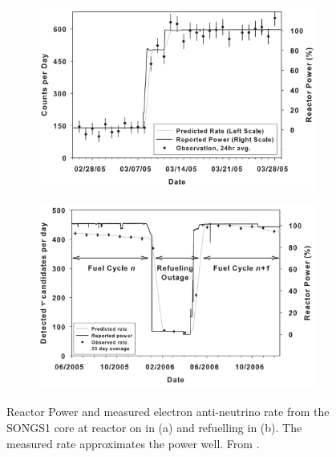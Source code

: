 \begin{figure}[!h]
\centering
\begin{subfigure}{.5\textwidth}
  \centering
  \includegraphics[width=\linewidth]{Chapter1/Figs/reactorPowerSongsS1.png}
  \captionsetup{width=.9\linewidth}
  \caption{}
  \label{subFig:reactorPowerSongsS1}
\end{subfigure}%
\begin{subfigure}{.5\textwidth}
  \centering
\includegraphics[width=\linewidth]{Chapter1/Figs/reactorRefulingSongs1.png}
  \captionsetup{width=.9\linewidth}
  \caption{}
  \label{subFig:reactorRefulingSongs1}
\end{subfigure}
\caption{Reactor Power and measured electron anti-neutrino rate from the SONGS1 core at reactor on in (a) and refuelling in (b). The measured rate approximates the power well. From \cite{Bowden_2008}.}
\label{fig:reactorPowerAndRefuelingSongsS1}
\end{figure}

